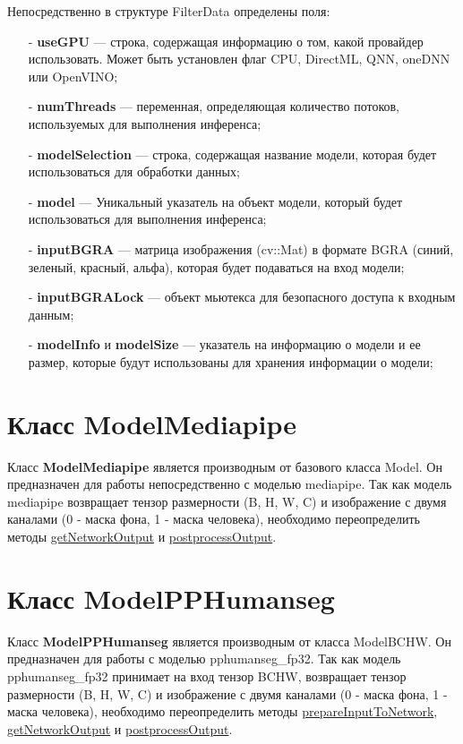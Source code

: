 \documentclass[a4paper,14pt]{extreport}
\begin{document}
        Непосредственно в структуре FilterData определены поля:
        \begin{itemize}
          \item[-] \textbf{useGPU} — строка, содержащая информацию о том, какой провайдер использовать. Может быть установлен флаг CPU, DirectML, QNN, oneDNN или OpenVINO;
          \item[-] \textbf{numThreads} — переменная, определяющая количество потоков, используемых для выполнения инференса;
          \item[-] \textbf{modelSelection} — строка, содержащая название модели, которая будет использоваться для обработки данных;
          \item[-] \textbf{model} — Уникальный указатель на объект модели, который будет использоваться для выполнения инференса;
          \item[-] \textbf{inputBGRA} — матрица изображения (cv::Mat) в формате BGRA (синий, зеленый, красный, альфа), которая будет подаваться на вход модели;
          \item[-] \textbf{inputBGRALock} — объект мьютекса для безопасного доступа к входным данным;
          \item[-] \textbf{modelInfo} и \textbf{modelSize} — указатель на информацию о модели и ее размер, которые будут использованы для хранения информации о модели;
        \end{itemize}

        \section{Класс ModelMediapipe}
        Класс \textbf{ModelMediapipe} является производным от базового класса Model. Он предназначен для работы непосредственно с моделью mediapipe. Так как модель mediapipe возвращает тензор размерности (B, H, W, C) и изображение с двумя каналами (0 - маска фона, 1 - маска человека), необходимо переопределить методы \hyperlink{getOutput}{getNetworkOutput} и \hyperlink{postprocess}{postprocessOutput}.
        

        \section{Класс ModelPPHumanseg}
        Класс \textbf{ModelPPHumanseg} является производным от класса ModelBCHW. Он предназначен для работы с моделью pphumanseg\_fp32. Так как модель pphumanseg\_fp32 принимает на вход тензор BCHW, возвращает тензор размерности (B, H, W, C) и изображение с двумя каналами (0 - маска фона, 1 - маска человека), необходимо переопределить методы \hyperlink{prepareInput}{prepareInputToNetwork}, \hyperlink{getOutput}{getNetworkOutput} и \hyperlink{postprocess}{postprocessOutput}.
        
\end{document}
